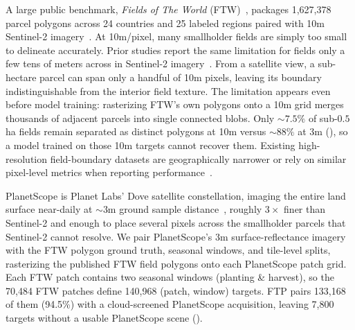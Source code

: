 \documentclass[10pt,twocolumn,letterpaper]{article}
\begin{document}
A large public benchmark, \emph{Fields of The World} (FTW)~\cite{kerner2024ftw}, packages 1{,}627{,}378 parcel polygons across 24 countries and 25 labeled regions paired with 10m Sentinel-2 imagery~\cite{drusch2012sentinel2}. At 10m/pixel, many smallholder fields are simply too small to delineate accurately. Prior studies report the same limitation for fields only a few tens of meters across in Sentinel-2 imagery~\cite{persello2019delineation,wang2022unlocking,garciapedrero2017boundary}. From a satellite view, a sub-hectare parcel can span only a handful of 10m pixels, leaving its boundary indistinguishable from the interior field texture. The limitation appears even before model training: rasterizing FTW's own polygons onto a 10m grid merges thousands of adjacent parcels into single connected blobs. Only $\sim$$7.5\%$ of sub-$0.5$\,ha fields remain separated as distinct polygons at 10m versus $\sim$$88\%$ at 3m (), so a model trained on those 10m targets cannot recover them. Existing high-resolution field-boundary datasets are geographically narrower or rely on similar pixel-level metrics when reporting performance~\cite{wang2022unlocking,dandrimont2021parcel,estes2024africa,pastishd}.

PlanetScope is Planet Labs' Dove satellite constellation, imaging the entire land surface near-daily at $\sim$3m ground sample distance~\cite{planet2017}, roughly $3\times$ finer than Sentinel-2 and enough to place several pixels across the smallholder parcels that Sentinel-2 cannot resolve. We pair PlanetScope's 3m surface-reflectance imagery with the FTW polygon ground truth, seasonal windows, and tile-level splits, rasterizing the published FTW field polygons onto each PlanetScope patch grid. Each FTW patch contains two seasonal windows (planting \& harvest), so the 70{,}484 FTW patches define 140{,}968 (patch, window) targets. FTP pairs 133{,}168 of them (94.5\%) with a cloud-screened PlanetScope acquisition, leaving 7{,}800 targets without a usable PlanetScope scene ().
\end{document}
